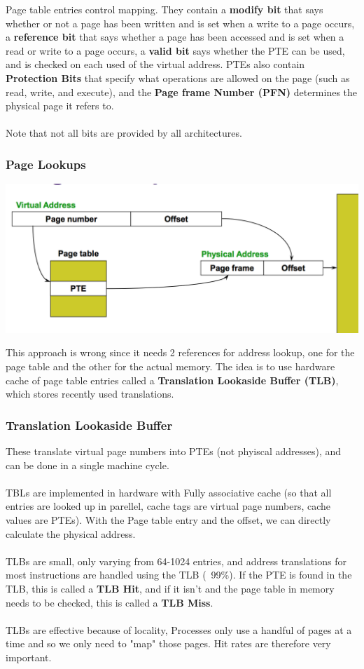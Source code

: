 \documentclass{article}
\begin{document}
Page table entries control mapping. They contain a \textbf{modify bit} that says whether or not a page has been written and is set when a write to a page occurs, a \textbf{reference bit} that says whether a page has been accessed and is set when a read or write to a page occurs, a \textbf{valid bit} says whether the PTE can be used, and is checked on each used of the virtual address. PTEs also contain \textbf{Protection Bits} that specify what operations are allowed on the page (such as read, write, and execute), and the \textbf{Page frame Number (PFN)} determines the physical page it refers to.\\
\\
Note that not all bits are provided by all architectures.

\subsubsection{Page Lookups}

\includegraphics[scale=.50]{pagelookup}

This approach is wrong since it needs 2 references for address lookup, one for the page table and the other for the actual memory. The idea is to use hardware cache of page table entries called a \textbf{Translation Lookaside Buffer (TLB)}, which stores recently used translations.

\subsubsection{Translation Lookaside Buffer}

These translate virtual page numbers into PTEs (not phyiscal addresses), and can be done in a single machine cycle.\\
\\
TBLs are implemented in hardware with Fully associative cache (so that all entries are looked up in parellel, cache tags are virtual page numbers, cache values are PTEs). With the Page table entry and the offset, we can directly calculate the physical address.\\
\\
TLBs are small, only varying from 64-1024 entries, and address translations for most instructions are handled using the TLB (~99\%). If the PTE is found in the TLB, this is called a \textbf{TLB Hit}, and if it isn't and the page table in memory needs to be checked, this is called a \textbf{TLB Miss}.
\\
\\
TLBs are effective because of locality, Processes only use a handful of pages at a time and so we only need to "map" those pages. Hit rates are therefore very important.
\end{document}
